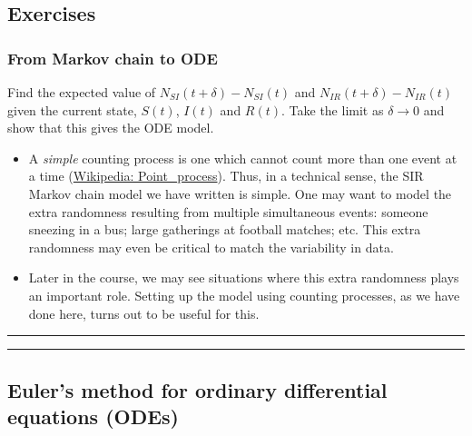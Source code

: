 \documentclass[]{article}
\begin{document}
\subsection{Exercises}\label{exercises}

\subsubsection{From Markov chain to ODE}\label{from-markov-chain-to-ode}

Find the expected value of \(N_{SI}(t+\delta)-N_{SI}(t)\) and
\(N_{IR}(t+\delta)-N_{IR}(t)\) given the current state, \(S(t)\),
\(I(t)\) and \(R(t)\). Take the limit as \(\delta\to 0\) and show that
this gives the ODE model.

\begin{itemize}
\item
  A \emph{simple} counting process is one which cannot count more than
  one event at a time
  (\href{https://en.wikipedia.org/wiki/Point_process}{Wikipedia:
  Point\_process}). Thus, in a technical sense, the SIR Markov chain
  model we have written is simple. One may want to model the extra
  randomness resulting from multiple simultaneous events: someone
  sneezing in a bus; large gatherings at football matches; etc. This
  extra randomness may even be critical to match the variability in
  data.
\item
  Later in the course, we may see situations where this extra randomness
  plays an important role. Setting up the model using counting
  processes, as we have done here, turns out to be useful for this.
\end{itemize}

\begin{center}\rule{0.5\linewidth}{\linethickness}\end{center}

\begin{center}\rule{0.5\linewidth}{\linethickness}\end{center}

\subsection{Euler's method for ordinary differential equations
(ODEs)}\label{eulers-method-for-ordinary-differential-equations-odes}
\end{document}
